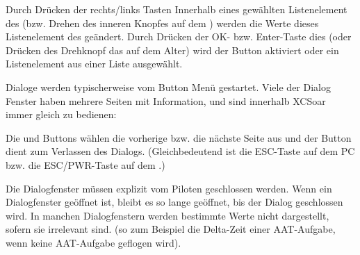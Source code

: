 Durch Drücken der rechts/links Tasten Innerhalb eines gewählten Listenelement des (bzw. Drehen des inneren Knopfes auf dem \al) werden die Werte dieses Listenelement des geändert. Durch Drücken der OK- bzw. Enter-Taste dies (oder Drücken des Drehknopf das auf dem Alter) wird der Button aktiviert oder ein Listenelement aus einer Liste ausgewählt.

Dialoge werden typischerweise vom Button Menü gestartet. Viele der Dialog Fenster haben mehrere Seiten mit Information, und sind innerhalb \textsf{XCSoar} immer gleich zu bedienen:

Die \button{$<$} und \button{$>$} Buttons wählen die vorherige bzw. die nächste Seite aus und der
 Button dient  zum Verlassen des Dialogs. (Gleichbedeutend ist die ESC-Taste auf dem \textsf{PC} bzw. die ESC/PWR-Taste  auf dem \al.)

Die Dialogfenster müssen explizit vom Piloten geschlossen werden. Wenn ein Dialogfenster geöffnet ist, bleibt es so lange geöffnet, bis der Dialog geschlossen wird. In manchen Dialogfenstern werden bestimmte  Werte nicht dargestellt, sofern sie irrelevant sind. (so zum Beispiel die Delta-Zeit einer AAT-Aufgabe, wenn keine AAT-Aufgabe geflogen wird).


